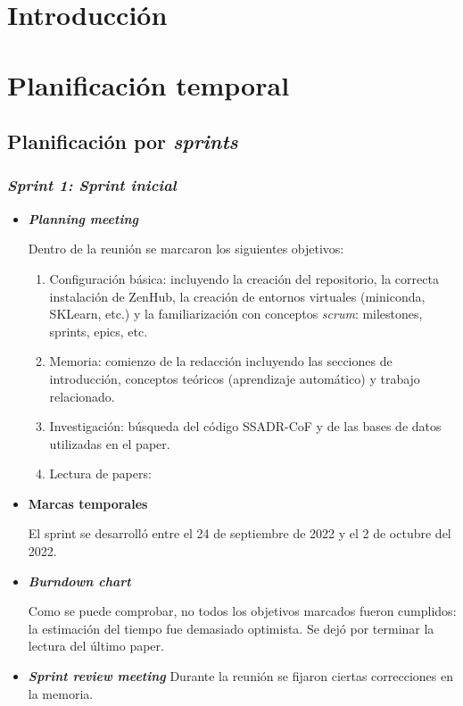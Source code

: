 
\section{Introducción}

\section{Planificación temporal}

\subsection{Planificación por \textit{sprints}}

\subsubsection{\textit{Sprint 1: Sprint inicial}}

\begin{itemize}
	\item \textbf{\textit{Planning meeting}}
	
	Dentro de la reunión se marcaron los siguientes objetivos:
	
	\begin{enumerate}
		\item Configuración básica: incluyendo la creación del repositorio, la correcta instalación de ZenHub, la creación de entornos virtuales (miniconda, SKLearn, etc.) y la familiarización con conceptos \textit{scrum}: milestones, sprints, epics, etc.
		
		\item Memoria: comienzo de la redacción incluyendo las secciones de introducción, conceptos teóricos (aprendizaje automático) y trabajo relacionado.
		
		\item Investigación: búsqueda del código SSADR-CoF y de las bases de datos utilizadas en el paper.
		
		\item Lectura de papers: 
	\end{enumerate}
	
	\item \textbf{Marcas temporales}
	
	El sprint se desarrolló entre el 24 de septiembre de 2022 y el 2 de octubre del 2022.
	
	\item \textbf{\textit{Burndown chart}}
	
	Como se puede comprobar, no todos los objetivos marcados fueron cumplidos: la estimación del tiempo fue demasiado optimista. Se dejó por terminar la lectura del último paper.
	
	\item \textbf{\textit{Sprint review meeting}}
	Durante la reunión se fijaron ciertas correcciones en la memoria.
	
	
\end{itemize}


